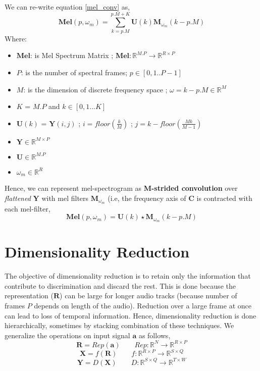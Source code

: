 \noindent We can re-write equation \ref{mel_conv} as, 
\begin{equation}
\label{mel_conv_flat}
\textbf{Mel}(p,\omega_{m}) = \displaystyle\sum_{k=p.M}^{p.M + K}\textbf{U}(k)\textbf{M}_{\omega_{m}}(k-p.M)
\end{equation}
Where:
\begin{itemize}[label=]
    \setlength\itemsep{0em}
    \item $\textbf{Mel}$: is Mel Spectrum Matrix ; $\textbf{Mel} : \mathbb{R}^{M.P} \rightarrow \mathbb{R}^{R \times P}$
    \item $P$: is the number of spectral frames; $p \in [0,1..P-1]$ 
    \item $M$: is the dimension of discrete frequency space ; $\omega = k-p.M \in \mathbb{R}^{M}$
    \item $K$ = $M.P$ and $k \in [0,1...K]$
    \item $\textbf{U}(k)$ = $\textbf{Y}(i,j)$ ; $i = floor(\frac{k}{M})$ ; $j = k-floor(\frac{Mk}{M-1})$
    \item $\textbf{Y} \in \mathbb{R}^{M \times P}$
    \item $\textbf{U} \in \mathbb{R}^{M.P}$
    \item $\omega_{m} \in  \mathbb{R}^{R}$
\end{itemize}

\noindent Hence, we can represent mel-spectrogram as \textbf{M-strided convolution} over \textit{flattened} $\textbf{Y}$ with mel filters $\textbf{M}_{\omega_{m}}$ (i.e, the frequency axis of $\textbf{C}$ is contracted with each mel-filter, 
\begin{equation}
\boxed
{
  \textbf{Mel}(p, \omega_{m} ) = \textbf{U}(k) \star \textbf{M}_{\omega_{m}}(k - p.M)
}
\end{equation}
  
\bigskip

\section{Dimensionality Reduction}
\label{dimension}
The objective of dimensionality reduction is to retain only the information that contribute to discrimination and discard the rest. This is done because the representation ($\textbf{R}$) can be large for longer audio tracks (because number of frames $P$ depends on length of the audio). Reduction over a large frame at once can lead to loss of temporal information. Hence, dimensionality reduction is done hierarchically, sometimes by stacking combination of these techniques. We generalize the operations on input signal $\textbf{a}$ as follows,
\[
   \textbf{R} = Rep(\textbf{a}) \qquad Rep : \mathbb{R}^{N} \rightarrow \mathbb{R}^{R \times P}
\]
\[
   \textbf{X} = f(\textbf{R}) \qquad f : \mathbb{R}^{R \times P} \rightarrow \mathbb{R}^{S \times Q} 
\]
\begin{equation}
\label{dim_red_abstract}
   \textbf{Y} = D(\textbf{X}) \qquad D : \mathbb{R}^{S \times Q} \rightarrow \mathbb{R}^{T \times W} 
\end{equation}
 

